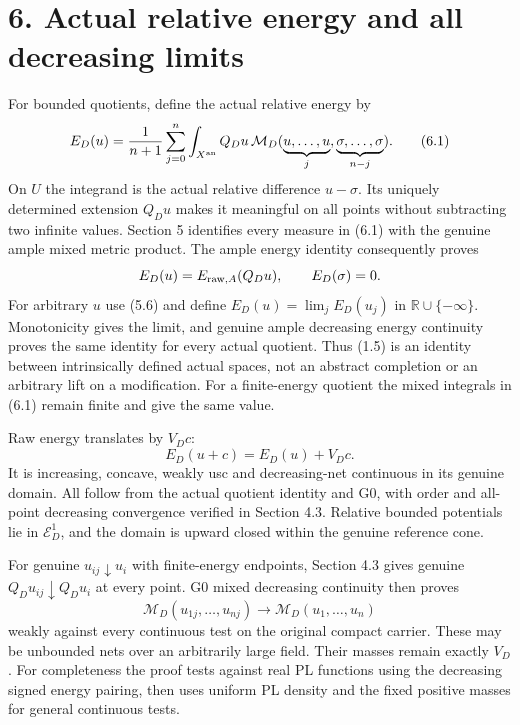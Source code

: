 \documentclass[
  10pt,
]{article}
\begin{document}
\section{6. Actual relative energy and all decreasing
limits}\label{actual-relative-energy-and-all-decreasing-limits}

For bounded quotients, define the actual relative energy by \[
 E_D(u)=\frac1{n+1}\sum_{j=0}^n
       \int_{X^{\rm an}}Q_Du\,
          \mathcal M_D(\underbrace{u,\ldots,u}_{j},
                         \underbrace{\sigma,\ldots,\sigma}_{n-j}). \tag{6.1}
\] On \(U\) the integrand is the actual relative difference
\(u-\sigma\). Its uniquely determined extension \(Q_Du\) makes it
meaningful on all points without subtracting two infinite values.
Section 5 identifies every measure in (6.1) with the genuine ample mixed
metric product. The ample energy identity consequently proves \[
                     E_D(u)=E_{{\rm raw},A}(Q_Du),\qquad E_D(\sigma)=0.
\] For arbitrary \(u\) use (5.6) and define \(E_D(u)=\lim_j E_D(u_j)\)
in \(\mathbb R\cup\{-\infty\}\). Monotonicity gives the limit, and
genuine ample decreasing energy continuity proves the same identity for
every actual quotient. Thus (1.5) is an identity between intrinsically
defined actual spaces, not an abstract completion or an arbitrary lift
on a modification. For a finite-energy quotient the mixed integrals in
(6.1) remain finite and give the same value.

Raw energy translates by \(V_D c\): \[
             E_D(u+c)=E_D(u)+V_Dc.                            \tag{6.2}
\] It is increasing, concave, weakly usc and decreasing-net continuous
in its genuine domain. All follow from the actual quotient identity and
G0, with order and all-point decreasing convergence verified in Section
4.3. Relative bounded potentials lie in \(\mathcal E_D^1\), and the
domain is upward closed within the genuine reference cone.

For genuine \(u_{ij}\downarrow u_i\) with finite-energy endpoints,
Section 4.3 gives genuine \(Q_Du_{ij}\downarrow Q_Du_i\) at every point.
G0 mixed decreasing continuity then proves \[
                \mathcal M_D(u_{1j},\ldots,u_{nj})
                        \longrightarrow\mathcal M_D(u_1,\ldots,u_n)
\] weakly against every continuous test on the original compact carrier.
These may be unbounded nets over an arbitrarily large field. Their
masses remain exactly \(V_D\). For completeness the proof tests against
real PL functions using the decreasing signed energy pairing, then uses
uniform PL density and the fixed positive masses for general continuous
tests.
\end{document}
